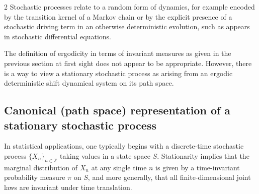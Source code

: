 \documentclass[11pt]{article}
\begin{document}
\begin{multicols}{2}
Stochastic processes relate to a random form of dynamics, for example encoded by the transition kernel of a Markov chain or by the explicit presence of a stochastic driving term in an otherwise deterministic evolution, such as appears in stochastic differential equations.

The definition of ergodicity in terms of invariant measures as given in the previous section at first sight does not appear to be appropriate. However, there is a way to view a stationary stochastic process as arising from an ergodic deterministic shift dynamical system on its path space. 

\subsection{Canonical (path space) representation of a stationary stochastic process}\label{secpathspace}

In statistical applications, one typically begins with a discrete-time stochastic process $\{X_n\}_{n \in \mathbb{Z}}$ taking values in a state space $S$. Stationarity implies that the marginal distribution of $X_n$ at any single time $n$ is given by a time-invariant probability measure $\pi$ on $S$, and more generally, that all finite-dimensional joint laws are invariant under time translation.


\end{multicols}
\end{document}
